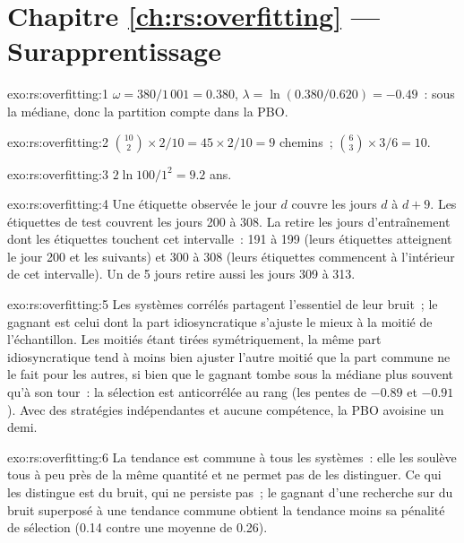 \section*{Chapitre \ref{ch:rs:overfitting} --- Surapprentissage}

\begin{solution}{exo:rs:overfitting:1}
$\omega = 380/1\,001 = 0.380$, $\lambda = \ln(0.380/0.620) = -0.49$~: sous la médiane, donc la partition compte dans la PBO.
\end{solution}

\begin{solution}{exo:rs:overfitting:2}
$\binom{10}{2}\times 2/10 = 45 \times 2/10 = 9$ chemins~; $\binom{6}{3} \times 3/6 = 10$.
\end{solution}

\begin{solution}{exo:rs:overfitting:3}
$2\ln 100/1^2 = 9.2$ ans.
\end{solution}

\begin{solution}{exo:rs:overfitting:4}
Une étiquette observée le jour $d$ couvre les jours $d$ à $d + 9$. Les étiquettes de test couvrent les jours 200 à 308. La  retire les jours d'entraînement dont les étiquettes touchent cet intervalle~:
191 à 199 (leurs étiquettes atteignent le jour 200 et les suivants) et 300 à 308 (leurs étiquettes commencent à l'intérieur de cet intervalle). Un  de 5 jours retire aussi les jours 309 à 313.
\end{solution}

\begin{solution}{exo:rs:overfitting:5}
Les systèmes corrélés partagent l'essentiel de leur bruit~; le gagnant  est celui dont la part idiosyncratique s'ajuste le mieux à la moitié de l'échantillon. Les moitiés
étant tirées symétriquement, la même part idiosyncratique tend à moins bien ajuster l'autre moitié que la part commune ne le fait pour les autres, si bien que le gagnant tombe sous
la médiane plus souvent qu'à son tour~: la sélection est anticorrélée au rang  (les pentes de $-0.89$ et $-0.91$). Avec des stratégies indépendantes et aucune
compétence, la PBO avoisine un demi.
\end{solution}

\begin{solution}{exo:rs:overfitting:6}
La tendance est commune à tous les systèmes~: elle les soulève tous à peu près de la même quantité et ne permet pas de les distinguer. Ce qui les distingue  est
du bruit, qui ne persiste pas~; le gagnant d'une recherche sur du bruit superposé à une tendance commune obtient la tendance moins sa pénalité de sélection (0.14 contre une
moyenne de 0.26).
\end{solution}

